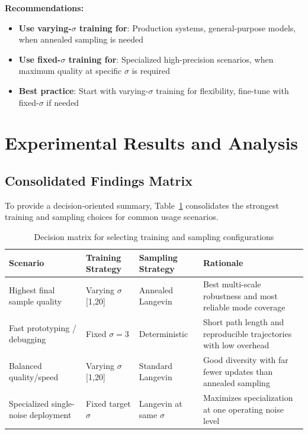\documentclass[journal]{IEEEtran}
\begin{document}
\textbf{Recommendations:}

\begin{itemize}
    \item \textbf{Use varying-$\sigma$ training for}: Production systems, general-purpose models, when annealed sampling is needed
    \item \textbf{Use fixed-$\sigma$ training for}: Specialized high-precision scenarios, when maximum quality at specific $\sigma$ is required
    \item \textbf{Best practice}: Start with varying-$\sigma$ training for flexibility, fine-tune with fixed-$\sigma$ if needed
\end{itemize}

\section{Experimental Results and Analysis}

\subsection{Consolidated Findings Matrix}

To provide a decision-oriented summary, Table~\ref{tab:decision_matrix} consolidates the strongest training and sampling choices for common usage scenarios.

\begin{table}[t]
\centering
\small
\setlength{\tabcolsep}{3pt}
\begin{tabular}{p{}p{}p{}p{}}
\toprule
Scenario & Training Strategy & Sampling Strategy & Rationale \\
\midrule
Highest final sample quality &
Varying $\sigma$ [1,20] &
Annealed Langevin &
Best multi-scale robustness and most reliable mode coverage \\
\midrule
Fast prototyping / debugging &
Fixed $\sigma=3$ &
Deterministic &
Short path length and reproducible trajectories with low overhead \\
\midrule
Balanced quality/speed &
Varying $\sigma$ [1,20] &
Standard Langevin &
Good diversity with far fewer updates than annealed sampling \\
\midrule
Specialized single-noise deployment &
Fixed target $\sigma$ &
Langevin at same $\sigma$ &
Maximizes specialization at one operating noise level \\
\bottomrule
\end{tabular}
\normalsize
\caption{Decision matrix for selecting training and sampling configurations}
\label{tab:decision_matrix}
\end{table}
\end{document}

